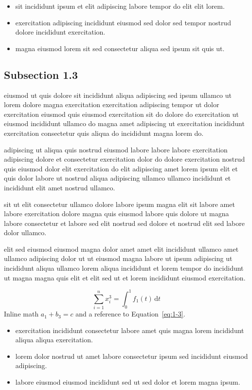 \documentclass{article}
\begin{document}
\begin{itemize}
  \item sit incididunt ipsum et elit adipiscing labore tempor do elit elit lorem.
  \item exercitation adipiscing incididunt eiusmod sed dolor sed tempor nostrud dolore incididunt exercitation.
  \item magna eiusmod lorem sit sed consectetur aliqua sed ipsum sit quis ut.
\end{itemize}

\subsection{Subsection 1.3}\label{sec:1-3}
eiusmod ut quis dolore sit incididunt aliqua adipiscing sed ipsum ullamco ut lorem dolore magna exercitation exercitation adipiscing tempor ut dolor exercitation eiusmod quis eiusmod exercitation sit do dolore do exercitation ut eiusmod incididunt ullamco do magna amet adipiscing ut exercitation incididunt exercitation consectetur quis aliqua do incididunt magna lorem do.

adipiscing ut aliqua quis nostrud eiusmod labore labore labore exercitation adipiscing dolore et consectetur exercitation dolor do dolore exercitation nostrud quis eiusmod dolor elit exercitation do elit adipiscing amet lorem ipsum elit et quis dolor labore ut nostrud aliqua adipiscing ullamco ullamco incididunt et incididunt elit amet nostrud ullamco.

sit ut elit consectetur ullamco dolore labore ipsum magna elit sit labore amet labore exercitation dolore magna quis eiusmod labore quis dolore ut magna labore consectetur et labore sed elit nostrud sed dolore et nostrud elit sed labore dolor ullamco.

elit sed eiusmod eiusmod magna dolor amet amet elit incididunt ullamco amet ullamco adipiscing dolor ut ut eiusmod magna labore ut ipsum adipiscing ut incididunt aliqua ullamco lorem aliqua incididunt et lorem tempor do incididunt ut magna magna quis elit et elit sed ut et lorem incididunt eiusmod exercitation.

\begin{equation}\label{eq:1-3}
  \sum_{i=1}^{n} x_i^{3} = \int_0^1 f_{1}(t)\,\mathrm{d}t
\end{equation}
Inline math $a_{1} + b_{3} = c$ and a reference to Equation~\eqref{eq:1-3}.

\begin{itemize}
  \item exercitation incididunt consectetur labore amet quis magna lorem incididunt aliqua aliqua exercitation.
  \item lorem dolor nostrud ut amet labore consectetur ipsum sed incididunt eiusmod adipiscing.
  \item labore eiusmod eiusmod incididunt sed ut sed dolor et lorem magna ipsum.
\end{itemize}
\end{document}
